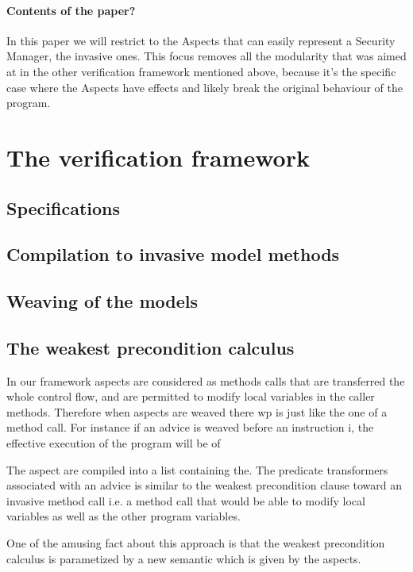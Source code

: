\documentclass[draft]{llncs}
\begin{document}
\paragraph{Contents of the paper?}
In this paper we will restrict to the Aspects that can easily represent a
Security Manager, the invasive 
ones. This focus removes all the modularity that was aimed at in the other
verification framework mentioned above,
because it's the specific case where the Aspects have effects and likely break
the original behaviour of the program.




\section{The verification framework}



\subsection{Specifications}


\subsection{Compilation to invasive model methods}

\subsection{Weaving of the models}


\subsection{The weakest precondition calculus}

In our framework aspects are considered as methods calls that are transferred the whole
control flow, and are permitted to modify local variables in the caller methods. Therefore when aspects are weaved
there wp is just like the one of a method call.
For instance if an advice is weaved before an instruction i, the effective execution of the program
will be of

The aspect are compiled into a list containing the.
The predicate transformers associated with an advice is similar to the weakest precondition
clause toward an invasive method call i.e. a method call that would be able to modify local variables
as well as the other program variables.

One of the amusing fact about this approach is that the weakest precondition calculus is parametized by a new 
semantic which is given by the aspects.
\end{document}

